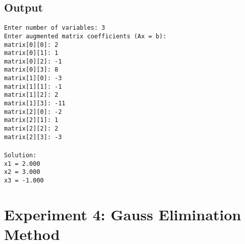 \documentclass[12pt,a4paper]{article}
\begin{document}
\subsection*{Output}
\begin{tcolorbox}[terminalstyle, title=Sample Output]
\texttt{Enter number of variables: 3 \\
Enter augmented matrix coefficients (Ax = b): \\
matrix[0][0]: 2\\
matrix[0][1]: 1\\
matrix[0][2]: -1\\
matrix[0][3]: 8\\
matrix[1][0]: -3\\
matrix[1][1]: -1\\
matrix[1][2]: 2\\
matrix[1][3]: -11\\
matrix[2][0]: -2\\
matrix[2][1]: 1\\
matrix[2][2]: 2\\
matrix[2][3]: -3\\
\\
Solution:\\
x1 = 2.000\\
x2 = 3.000\\
x3 = -1.000}
\end{tcolorbox}

\newpage
\section*{Experiment 4: Gauss Elimination Method}
\end{document}
